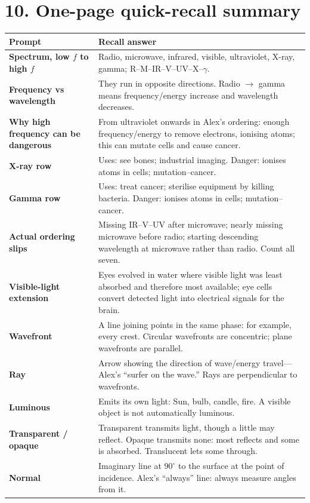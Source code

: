 \documentclass[11pt,a4paper]{article}
\begin{document}
\section*{10. One-page quick-recall summary}
\footnotesize
\renewcommand{\arraystretch}{1.18}
\begin{tabularx}{\linewidth}{>{\bfseries}p{.22\linewidth}Y}
\toprule
Prompt & Recall answer\\
\midrule
Spectrum, low $f$ to high $f$ & Radio, microwave, infrared, visible, ultraviolet, X-ray, gamma; R--M--IR--V--UV--X--$\gamma$.\\
Frequency vs wavelength & They run in opposite directions. Radio $\rightarrow$ gamma means frequency/energy increase and wavelength decreases.\\
Why high frequency can be dangerous & From ultraviolet onwards in Alex's ordering: enough frequency/energy to remove electrons, ionising atoms; this can mutate cells and cause cancer.\\
X-ray row & Uses: see bones; industrial imaging. Danger: ionises atoms in cells; mutation--cancer.\\
Gamma row & Uses: treat cancer; sterilise equipment by killing bacteria. Danger: ionises atoms in cells; mutation--cancer.\\
Actual ordering slips & Missing IR--V--UV after microwave; nearly missing microwave before radio; starting descending wavelength at microwave rather than radio. Count all seven.\\
Visible-light extension & Eyes evolved in water where visible light was least absorbed and therefore most available; eye cells convert detected light into electrical signals for the brain.\\
Wavefront & A line joining points in the same phase: for example, every crest. Circular wavefronts are concentric; plane wavefronts are parallel.\\
Ray & Arrow showing the direction of wave/energy travel---Alex's ``surfer on the wave.'' Rays are perpendicular to wavefronts.\\
Luminous & Emits its own light: Sun, bulb, candle, fire. A visible object is not automatically luminous.\\
Transparent / opaque & Transparent transmits light, though a little may reflect. Opaque transmits none: most reflects and some is absorbed. Translucent lets some through.\\
Normal & Imaginary line at $90^\circ$ to the surface at the point of incidence. Alex's ``always'' line: always measure angles from it.\\

\end{tabularx}
\end{document}
